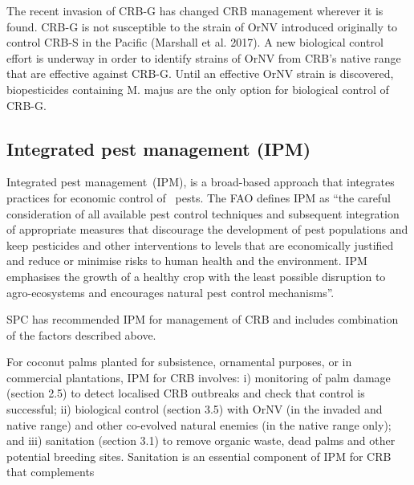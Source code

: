 \documentclass[twocolumn,letterpaper]{scrartcl}
\begin{document}
The recent invasion of CRB-G has changed CRB management wherever it is found. CRB-G is not susceptible to 
the strain of OrNV introduced originally to control CRB-S in the Pacific (Marshall et al. 2017). A new biological 
control effort is underway in order to identify strains of OrNV from CRB’s native range that are effective against 
CRB-G. Until an effective OrNV strain is discovered, biopesticides containing M. majus are the only option for 
biological control of CRB-G. 

\subsection{Integrated pest management (IPM)}

Integrated pest management (IPM), is a broad-based approach that integrates practices for economic control 
of  pests.  The  FAO  defines  IPM  as  “the  careful  consideration  of  all  available  pest  control  techniques  and 
subsequent integration of appropriate measures that discourage the development of pest populations and 
keep pesticides and other interventions to levels that are economically justified and reduce or minimise risks 
to human health and the environment. IPM emphasises the growth of a healthy crop with the least possible 
disruption to agro-ecosystems and encourages natural pest control mechanisms”.

SPC has recommended IPM for management of CRB and includes combination of the factors described above. 

For coconut palms planted for subsistence, ornamental purposes, or in commercial plantations, IPM for CRB 
involves: i) monitoring of palm damage (section 2.5) to detect localised CRB outbreaks and check that control is 
successful; ii) biological control (section 3.5) with OrNV (in the invaded and native range) and other co-evolved 
natural enemies (in the native range only); and iii) sanitation (section 3.1) to remove organic waste, dead palms 
and  other  potential  breeding  sites.  Sanitation  is  an  essential  component  of  IPM  for  CRB  that  complements 
\end{document}
